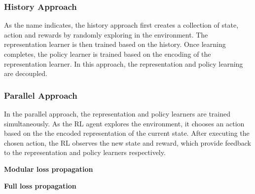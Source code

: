 \subsubsection{History Approach}
As the name indicates, the history approach first creates a collection of state, action and rewards by randomly exploring in the environment.
The representation learner is then trained based on the history.
Once learning completes, the policy learner is trained based on the encoding of the representation learner.
In this approach, the representation and policy learning are decoupled. 

\subsubsection{Parallel Approach}
In the parallel approach, the representation and policy learners are trained simultaneously.
As the RL agent explores the environment, it chooses an action based on the the encoded representation of the current state.
After executing the chosen action, the RL observes the new state and reward, which provide feedback to the representation and policy learners respectively.

\textbf{Modular loss propagation}


\textbf{Full loss propagation}